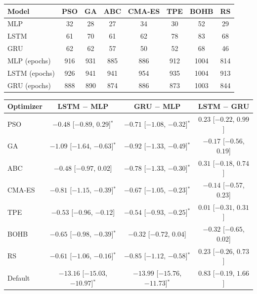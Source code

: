 \begin{tabular}{lccccccc}
\toprule
\textbf{Model} & \textbf{PSO} & \textbf{GA} & \textbf{ABC} & \textbf{CMA-ES} & \textbf{TPE} & \textbf{BOHB} & \textbf{RS} \\
\midrule
MLP & 32 & 28 & 27 & 34 & 30 & 52 & 29 \\
LSTM & 61 & 70 & 61 & 62 & 78 & 83 & 68 \\
GRU & 62 & 62 & 57 & 50 & 52 & 68 & 46 \\
\midrule
MLP (epochs) & 916 & 931 & 885 & 886 & 912 & 1004 & 814 \\
LSTM (epochs) & 926 & 941 & 941 & 954 & 935 & 1004 & 913 \\
GRU (epochs) & 888 & 890 & 874 & 886 & 873 & 1003 & 844 \\
\bottomrule
\end{tabular}

\begin{tabular}{lccc}
\toprule
\textbf{Optimizer} & \textbf{LSTM $-$ MLP} & \textbf{GRU $-$ MLP} & \textbf{LSTM $-$ GRU} \\
\midrule
PSO & $-0.48$ [$-0.89$, $0.29$]$^{*}$ & $-0.71$ [$-1.08$, $-0.32$]$^{*}$ & $0.23$ [$-0.22$, $0.99$] \\
GA & $-1.09$ [$-1.64$, $-0.63$]$^{*}$ & $-0.92$ [$-1.33$, $-0.49$]$^{*}$ & $-0.17$ [$-0.56$, $0.19$] \\
ABC & $-0.48$ [$-0.97$, $0.02$] & $-0.78$ [$-1.33$, $-0.30$]$^{*}$ & $0.31$ [$-0.18$, $0.74$] \\
CMA-ES & $-0.81$ [$-1.15$, $-0.39$]$^{*}$ & $-0.67$ [$-1.05$, $-0.23$]$^{*}$ & $-0.14$ [$-0.57$, $0.23$] \\
TPE & $-0.53$ [$-0.96$, $-0.12$] & $-0.54$ [$-0.93$, $-0.25$]$^{*}$ & $0.01$ [$-0.31$, $0.31$] \\
BOHB & $-0.65$ [$-0.98$, $-0.39$]$^{*}$ & $-0.32$ [$-0.72$, $0.04$] & $-0.32$ [$-0.65$, $0.02$] \\
RS & $-0.61$ [$-1.06$, $-0.16$]$^{*}$ & $-0.85$ [$-1.12$, $-0.58$]$^{*}$ & $0.23$ [$-0.26$, $0.73$] \\
Default & $-13.16$ [$-15.03$, $-10.97$]$^{*}$ & $-13.99$ [$-15.76$, $-11.73$]$^{*}$ & $0.83$ [$-0.19$, $1.66$] \\
\bottomrule
\end{tabular}

